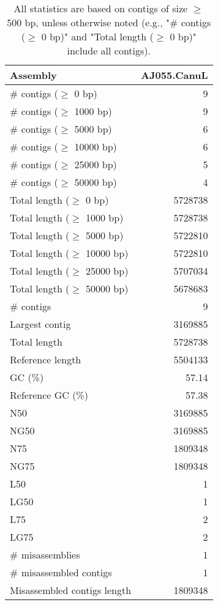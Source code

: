 \documentclass[12pt,a4paper]{article}
\begin{document}
\begin{table}[ht]
\begin{center}
\caption{All statistics are based on contigs of size $\geq$ 500 bp, unless otherwise noted (e.g., "\# contigs ($\geq$ 0 bp)" and "Total length ($\geq$ 0 bp)" include all contigs).}
\begin{tabular}{|l*{1}{|r}|}
\hline
Assembly & AJ055.CanuL \\ \hline
\# contigs ($\geq$ 0 bp) & 9 \\ \hline
\# contigs ($\geq$ 1000 bp) & 9 \\ \hline
\# contigs ($\geq$ 5000 bp) & 6 \\ \hline
\# contigs ($\geq$ 10000 bp) & 6 \\ \hline
\# contigs ($\geq$ 25000 bp) & 5 \\ \hline
\# contigs ($\geq$ 50000 bp) & 4 \\ \hline
Total length ($\geq$ 0 bp) & 5728738 \\ \hline
Total length ($\geq$ 1000 bp) & 5728738 \\ \hline
Total length ($\geq$ 5000 bp) & 5722810 \\ \hline
Total length ($\geq$ 10000 bp) & 5722810 \\ \hline
Total length ($\geq$ 25000 bp) & 5707034 \\ \hline
Total length ($\geq$ 50000 bp) & 5678683 \\ \hline
\# contigs & 9 \\ \hline
Largest contig & 3169885 \\ \hline
Total length & 5728738 \\ \hline
Reference length & 5504133 \\ \hline
GC (\%) & 57.14 \\ \hline
Reference GC (\%) & 57.38 \\ \hline
N50 & 3169885 \\ \hline
NG50 & 3169885 \\ \hline
N75 & 1809348 \\ \hline
NG75 & 1809348 \\ \hline
L50 & 1 \\ \hline
LG50 & 1 \\ \hline
L75 & 2 \\ \hline
LG75 & 2 \\ \hline
\# misassemblies & 1 \\ \hline
\# misassembled contigs & 1 \\ \hline
Misassembled contigs length & 1809348 \\ \hline

\end{tabular}
\end{center}
\end{table}
\end{document}
